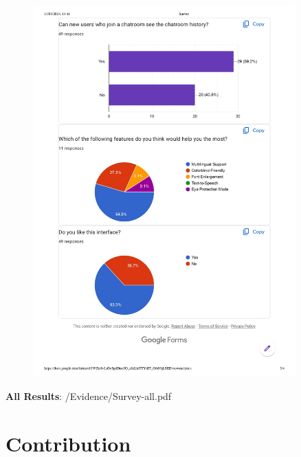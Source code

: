 \documentclass[12pt]{article}
\begin{document}
\begin{figure}[H]
    \centering
    \includegraphics[width=0.9\textwidth]{graphs/Survey-summary_page-0003.jpg}
\end{figure}

\textbf{All Results}: /Evidence/Survey-all.pdf

\section{Contribution}


 
\end{document}
